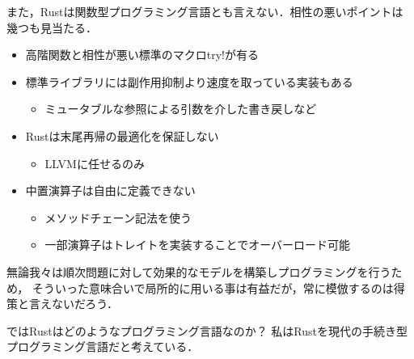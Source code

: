また，Rustは関数型プログラミング言語とも言えない．相性の悪いポイントは幾つも見当たる．

\begin{itemize}
\item 高階関数と相性が悪い標準のマクロtry!が有る
\item 標準ライブラリには副作用抑制より速度を取っている実装もある
  \begin{itemize}
  \item ミュータブルな参照による引数を介した書き戻しなど
  \end{itemize}
\item Rustは末尾再帰の最適化を保証しない
  \begin{itemize}
  \item LLVMに任せるのみ
  \end{itemize}
\item 中置演算子は自由に定義できない
  \begin{itemize}
  \item メソッドチェーン記法を使う
  \item 一部演算子はトレイトを実装することでオーバーロード可能
  \end{itemize}
\end{itemize}

無論我々は順次問題に対して効果的なモデルを構築しプログラミングを行うため，
そういった意味合いで局所的に用いる事は有益だが，常に模倣するのは得策と言えないだろう．

ではRustはどのようなプログラミング言語なのか？
私はRustを現代の手続き型プログラミング言語だと考えている．


